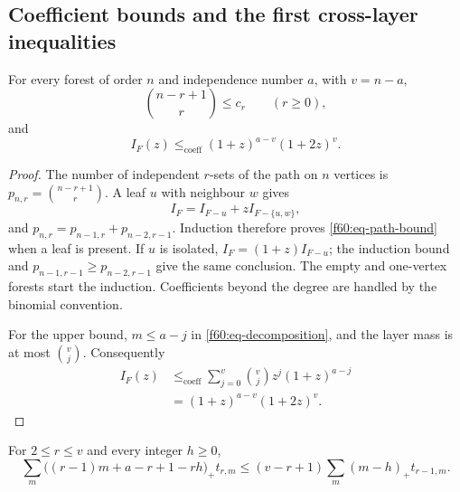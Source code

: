 \subsection{Coefficient bounds and the first cross-layer inequalities}
\label{f60:subsec-old-rows}

\begin{lemma}
\label{f60:lem-path-matching}
For every forest of order $n$ and independence number $a$, with $v=n-a$,
\begin{equation}
 \binom{n-r+1}{r}\le c_r\qquad(r\ge0),
 \label{f60:eq-path-bound}
\end{equation}
and
\begin{equation}
 I_F(z)\le_{\mathrm{coeff}}(1+z)^{a-v}(1+2z)^v.
 \label{f60:eq-matching-bound}
\end{equation}
\end{lemma}

\begin{proof}
The number of independent $r$-sets of the path on $n$ vertices is
$p_{n,r}=\binom{n-r+1}{r}$.  A leaf $u$ with neighbour $w$ gives
\[
 I_F=I_{F-u}+zI_{F-\{u,w\}},
\]
and $p_{n,r}=p_{n-1,r}+p_{n-2,r-1}$.  Induction therefore proves
\eqref{f60:eq-path-bound} when a leaf is present.  If $u$ is isolated,
$I_F=(1+z)I_{F-u}$; the induction bound and
$p_{n-1,r-1}\ge p_{n-2,r-1}$ give the same conclusion.  The empty and
one-vertex forests start the induction.  Coefficients beyond the degree
are handled by the binomial convention.

For the upper bound, $m\le a-j$ in
\eqref{f60:eq-decomposition}, and the layer mass is at most $\binom vj$.
Consequently
\begin{align*}
 I_F(z)&\le_{\mathrm{coeff}}
 \sum_{j=0}^{v}\binom vj z^j(1+z)^{a-j}\\
 &=(1+z)^{a-v}(1+2z)^v.
\end{align*}
\end{proof}

\begin{lemma}
\label{f60:lem-private}
For $2\le r\le v$ and every integer $h\ge0$,
\begin{equation}
 \sum_m\bigl((r-1)m+a-r+1-rh\bigr)_+t_{r,m}
 \le(v-r+1)\sum_m(m-h)_+t_{r-1,m}.
 \label{f60:eq-private}
\end{equation}
\end{lemma}

